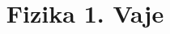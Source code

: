 \documentclass[11pt, a4paper]{article}
\begin{document}
\title{Fizika 1. Vaje}
\maketitle

\newpage
\tableofcontents
\newpage


\end{document}
